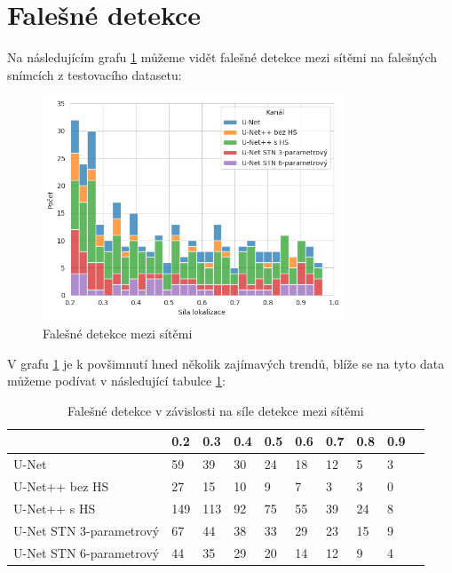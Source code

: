 \section{Falešné detekce}
\label{sec:Chapter63}

Na následujícím grafu \ref{fig:nets_false_detections} můžeme vidět falešné detekce mezi sítěmi na falešných snímcích z testovacího datasetu:

\begin{figure}[H]
\centering
\includegraphics[width=0.8\textwidth,keepaspectratio]{Figures/plots/recall_graph_a.png}
\caption[Falešné detekce mezi sítěmi]{Falešné detekce mezi sítěmi}
\label{fig:nets_false_detections}
\end{figure}

V grafu \ref{fig:nets_false_detections} je k povšimnutí hned několik zajímavých trendů, blíže se na tyto data můžeme podívat v následující tabulce \ref{tab:false_detections}:

\begin{table}[H]
    \centering
    \begin{tabular}{llllllllll}
    \toprule
    & 0.2 & 0.3 & 0.4 & 0.5 & 0.6 & 0.7 & 0.8 & 0.9 \\
    \midrule
    U-Net & 59 & 39 & 30 & 24 & 18 & 12 & 5 & 3 \\
    U-Net++ bez HS & 27 & 15 & 10 & 9 & 7 & 3 & 3 & 0 \\
    U-Net++ s HS & 149 & 113 & 92 & 75 & 55 & 39 & 24 & 8 \\
    U-Net STN 3-parametrový & 67 & 44 & 38 & 33 & 29 & 23 & 15 & 9 \\
    U-Net STN 6-parametrový & 44 & 35 & 29 & 20 & 14 & 12 & 9 & 4 \\
    \bottomrule
    \end{tabular}
    \caption[Falešné detekce v závislosti na síle detekce]{Falešné detekce v závislosti na síle detekce mezi sítěmi}
    \label{tab:false_detections}
\end{table}

